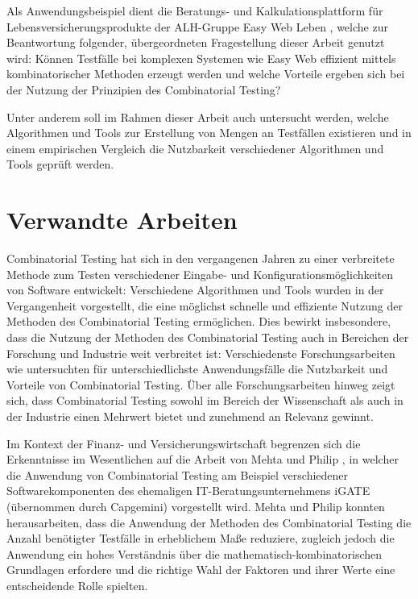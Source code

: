 Als Anwendungsbeispiel dient die Beratungs- und Kalkulationsplattform für Lebensversicherungsprodukte der ALH-Gruppe \glqq Easy Web Leben\grqq{} \cite{easy_web}, welche zur Beantwortung folgender, übergeordneten Fragestellung dieser Arbeit genutzt wird: Können Testfälle bei komplexen Systemen wie Easy Web effizient mittels kombinatorischer Methoden erzeugt werden und welche Vorteile ergeben sich bei der Nutzung der Prinzipien des Combinatorial Testing? 

Unter anderem soll im Rahmen dieser Arbeit auch untersucht werden, welche Algorithmen und Tools zur Erstellung von Mengen an Testfällen existieren und in einem empirischen Vergleich die Nutzbarkeit verschiedener Algorithmen und Tools geprüft werden. 

\section{Verwandte Arbeiten}\label{sec:verwandteArbeiten}

Combinatorial Testing hat sich in den vergangenen Jahren zu einer verbreitete Methode zum Testen verschiedener Eingabe- und Konfigurationsmöglichkeiten von Software entwickelt: Verschiedene Algorithmen und Tools wurden in der Vergangenheit vorgestellt, die eine möglichst schnelle und effiziente Nutzung der Methoden des Combinatorial Testing ermöglichen. Dies bewirkt insbesondere, dass die Nutzung der Methoden des Combinatorial Testing auch in Bereichen der Forschung und Industrie weit verbreitet ist: Verschiedenste Forschungsarbeiten wie \cite{li2016applying,hagar2015introducing,smith2019measuring,ozcan2017applications,dhadyalla2014combinatorial,raunak2017combinatorial} untersuchten für unterschiedlichste Anwendungsfälle die Nutzbarkeit und Vorteile von Combinatorial Testing. Über alle Forschungsarbeiten hinweg zeigt sich, dass Combinatorial Testing sowohl im Bereich der Wissenschaft als auch in der Industrie einen Mehrwert bietet und zunehmend an Relevanz gewinnt.

Im Kontext der Finanz- und Versicherungswirtschaft begrenzen sich die Erkenntnisse im Wesentlichen auf die Arbeit von Mehta und Philip \cite{mehta2013applications}, in welcher die Anwendung von Combinatorial Testing am Beispiel verschiedener Softwarekomponenten des ehemaligen IT-Beratungsunternehmens iGATE (übernommen durch Capgemini) vorgestellt wird. Mehta und Philip konnten herausarbeiten, dass die Anwendung der Methoden des Combinatorial Testing die Anzahl benötigter Testfälle in erheblichem Maße reduziere, zugleich jedoch die Anwendung ein hohes Verständnis über die mathematisch-kombinatorischen Grundlagen erfordere und die richtige Wahl der Faktoren und ihrer Werte eine entscheidende Rolle spielten. 

